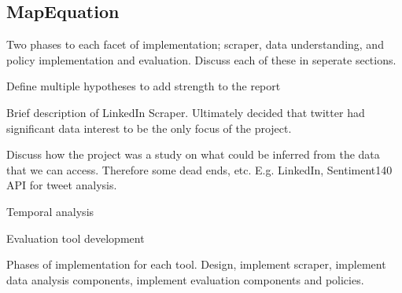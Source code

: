 \subsection{MapEquation}



Two phases to each facet of implementation; scraper, data understanding, and policy implementation and evaluation. Discuss each of these in seperate sections.

Define multiple hypotheses to add strength to the report

Brief description of LinkedIn Scraper. Ultimately decided that twitter had significant data interest to be the only focus of the project.

Discuss how the project was a study on what could be inferred from the data that we can access. Therefore some dead ends, etc. E.g. LinkedIn, Sentiment140 API for tweet analysis. 

Temporal analysis

Evaluation tool development

Phases of implementation for each tool. Design, implement scraper, implement data analysis components, implement evaluation components and policies. 